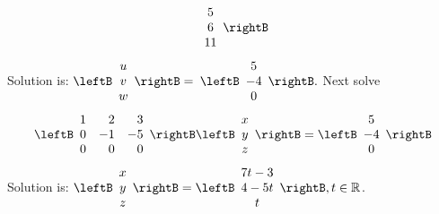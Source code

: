 \begin{enumialphparenastyle}
\begin{ex}
\begin{sol}
\[\begin{array}{c}
5 \\
6 \\
11
\end{array}
\rightB
\]
Solution is: $\leftB
\begin{array}{c}
u \\
v \\
w
\end{array}
\rightB =$ $\leftB
\begin{array}{c}
5 \\
-4 \\
0
\end{array}
\rightB .$ Next solve
\[
\leftB
\begin{array}{rrr}
1 & 2 & 3 \\
0 & -1 & -5 \\
0 & 0 & 0
\end{array}
\rightB \leftB
\begin{array}{c}
x \\
y \\
z
\end{array}
\rightB =\leftB
\begin{array}{c}
5 \\
-4 \\
0
\end{array}
\rightB
\]
Solution is: $\leftB
\begin{array}{c}
x \\
y \\
z
\end{array}
\rightB =\leftB
\begin{array}{c}
7t-3 \\
4-5t \\
t
\end{array}
\rightB ,t\in \mathbb{R}$.
\end{sol}
\end{ex}


\end{enumialphparenastyle}
